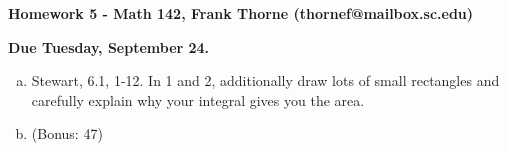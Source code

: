 \documentclass[12pt]{article}
\begin{document}
\setlength{\topmargin}{-2mm}





\begin{center}{\bf Homework 5 - Math 142, Frank Thorne (thornef@mailbox.sc.edu)}
\end{center}
\begin{center}
{\bf Due Tuesday, September 24.} 
\end{center}

\begin{enumerate}[(a)]
\item
Stewart, 6.1, 1-12. In 1 and 2, additionally draw lots of small rectangles and carefully
explain why your integral gives you the area.

\item
(Bonus: 47)
\\
\\
\end{enumerate}
\end{document}
